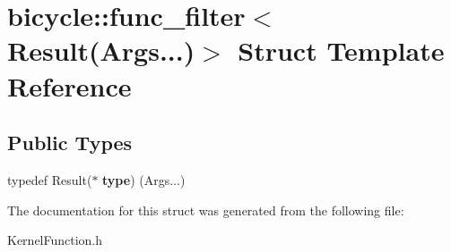\hypertarget{structbicycle_1_1func__filter_3_01_result_07_args_8_8_8_08_4}{}\section{bicycle\+:\+:func\+\_\+filter$<$ Result(Args...)$>$ Struct Template Reference}
\label{structbicycle_1_1func__filter_3_01_result_07_args_8_8_8_08_4}
\subsection*{Public Types}
\begin{DoxyCompactItemize}
\item 
\mbox{\label{structbicycle_1_1func__filter_3_01_result_07_args_8_8_8_08_4_a4cc2a468603b62d2c6639d9cad87d825}} 
typedef Result($\ast$ {\bfseries type}) (Args...)
\end{DoxyCompactItemize}


The documentation for this struct was generated from the following file\+:\begin{DoxyCompactItemize}
\item 
Kernel\+Function.\+h\end{DoxyCompactItemize}
